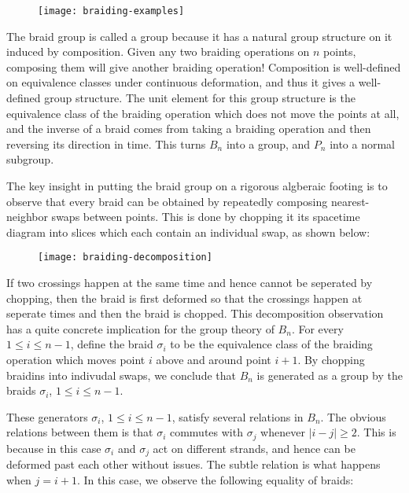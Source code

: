 \begin{figure}
\begin{center}
\texttt{[image: braiding-examples]}
\label{braiding-examples}
\end{center}
\end{figure}


The braid group is called a group because it has a natural group structure on it induced by composition. Given any two braiding operations on $n$ points, composing them will give another braiding operation!  Composition is well-defined on equivalence classes under continuous deformation, and thus it gives a well-defined group structure. The unit element for this group structure is the equivalence class of the braiding operation which does not move the points at all, and the inverse of a braid comes from taking a braiding operation and then reversing its direction in time. This turns $B_n$ into a group, and $P_n$ into a normal subgroup.

The key insight in putting the braid group on a rigorous algberaic footing is to observe that every braid can be obtained by repeatedly composing nearest-neighbor swaps between points. This is done by chopping it its spacetime diagram into slices which each contain an individual swap, as shown below:

\begin{figure}[h]
\begin{center}
\texttt{[image: braiding-decomposition]}
\label{braiding-decomposition}
\end{center}
\end{figure}


If two crossings happen at the same time and hence cannot be seperated by chopping, then the braid is first deformed so that the crossings happen at seperate times and then the braid is chopped. This decomposition observation has a quite concrete implication for the group theory of $B_n$. For every $1\leq i\leq n-1$, define the braid $\sigma_{i}$ to be the equivalence class of the braiding operation which moves point $i$ above and around point $i+1$. By chopping braidins into indivudal swaps, we conclude that $B_n$ is generated as a group by the braids $\sigma_i$, $1\leq i\leq n-1$.

These generators $\sigma_i$, $1\leq i\leq n-1$, satisfy several relations in $B_n$. The obvious relations between them is that $\sigma_i$ commutes with $\sigma_j$ whenever $|i-j|\geq 2$. This is because in this case $\sigma_i$ and $\sigma_j$ act on different strands, and hence can be deformed past each other without issues. The subtle relation is what happens when $j=i+1$. In this case, we observe the following equality of braids:

